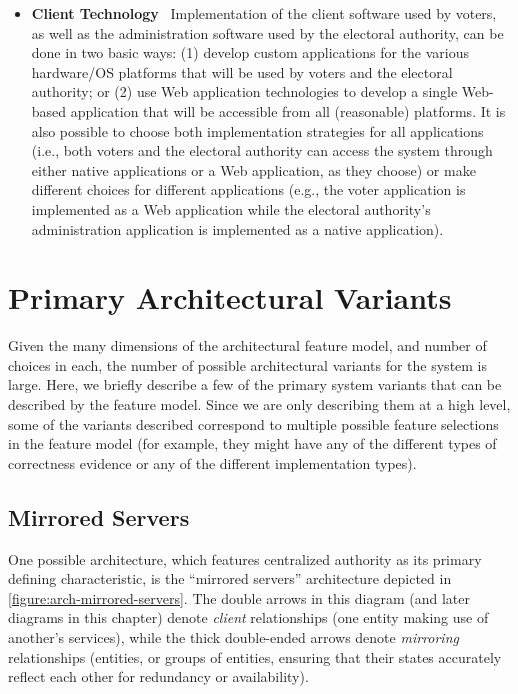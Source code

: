 \begin{itemize}
\item \textbf{Client Technology} \ Implementation of the client
  software used by voters, as well as the administration software used
  by the electoral authority, can be done in two basic ways: (1)
  develop custom applications for the various hardware/OS platforms
  that will be used by voters and the electoral authority; or (2) use
  Web application technologies to develop a single Web-based
  application that will be accessible from all (reasonable)
  platforms. It is also possible to choose both implementation
  strategies for all applications (i.e., both voters and the electoral
  authority can access the system through either native applications
  or a Web application, as they choose) or make different choices for
  different applications (e.g., the voter application is implemented
  as a Web application while the electoral authority's administration
  application is implemented as a native application).

\end{itemize}

\section{Primary Architectural Variants}

Given the many dimensions of the architectural feature model, and
number of choices in each, the number of possible architectural
variants for the system is large. Here, we briefly describe a few of
the primary system variants that can be described by the feature
model. Since we are only describing them at a high level, some of the
variants described correspond to multiple possible feature selections
in the feature model (for example, they might have any of the
different types of correctness evidence or any of the different
implementation types).

\subsection{Mirrored Servers}

One possible architecture, which features centralized authority as its
primary defining characteristic, is the ``mirrored servers''
architecture depicted in \autoref{figure:arch-mirrored-servers}. The
double arrows in this diagram (and later diagrams in this chapter)
denote \emph{client} relationships (one entity making use of another's
services), while the thick double-ended arrows denote \emph{mirroring}
relationships (entities, or groups of entities, ensuring that their
states accurately reflect each other for redundancy or availability).

